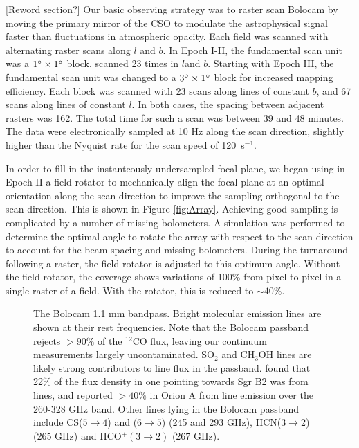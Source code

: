 \documentclass[12pt,preprint]{aastex}
\newcommand{\lon}{\ensuremath{l}}
\def\Figure#1#2#3#4{
\begin{figure}[htb]
\epsscale{#4}
\plotone{#1}
\caption{#2}
\label{#3}
\end{figure}
}
\begin{document}
[Reword section?] Our basic observing strategy was to raster scan Bolocam by moving the
primary mirror of the CSO to modulate the astrophysical signal faster
than fluctuations in atmospheric opacity.  Each field was scanned with
alternating raster scans along $l$ and $b$.  In Epoch I-II, the fundamental
scan unit was a $1\mbox{$^\circ$} \times 1\mbox{$^\circ$}$ block, scanned 23 times in \lon and
$b$.  Starting with Epoch III, the fundamental scan unit was changed to a
$3\mbox{$^\circ$} \times 1\mbox{$^\circ$}$ block for increased mapping efficiency.  Each block
was scanned with 23 scans along lines of constant $b$, and 67 scans along lines
of constant $l$.  In both cases, the spacing between adjacent rasters was
162\arcsec.  The total time for such a scan was between 39 and 48 minutes.  The
data were electronically sampled at 10 Hz along the scan direction, slightly
higher than the Nyquist rate for the scan speed of 120\arcsec\ s$^{-1}$.


In order to fill in the instanteously undersampled focal plane, we
began using in Epoch II a field rotator to mechanically align the
focal plane at an optimal orientation along the scan direction to
improve the sampling orthogonal to the scan direction.  This is shown
in Figure \ref{fig:Array}.  Achieving good sampling is complicated by
a number of missing bolometers.  A simulation was performed to determine
the optimal angle to rotate the array with respect to the scan
direction to account for the beam spacing and missing bolometers.  During
the turnaround following a raster, the field rotator is adjusted to
this optimum angle.
Without the field rotator, the coverage shows variations of 100\% from
pixel to pixel in a single raster of a field.  With the rotator, this
is reduced to $\sim40\%$.  


\Figure{bolocam_bandpass}{The Bolocam 1.1 mm bandpass.  Bright molecular
emission lines are shown at their rest frequencies.  Note that the Bolocam
passband rejects $>90\%$ of the $^{12}$CO flux, leaving our continuum
measurements largely uncontaminated.  SO$_2$ and CH$_3$OH lines are likely 
strong contributors to line flux in the passband.  \citet{nummelin1998} found
that 22\% of the flux density in one pointing towards Sgr B2 was from lines,
and \citet{yoshida2005} reported $>40\%$ in Orion A from line emission over the
260-328 GHz band. Other lines lying in the Bolocam passband include CS($5\to4$)
and ($6\to5$) (245 and 293 GHz), HCN($3\to2$) (265 GHz) and HCO$^+(3\to2)$ (267
GHz).  } 
{fig:Bandpass}{1.0}
\end{document}
